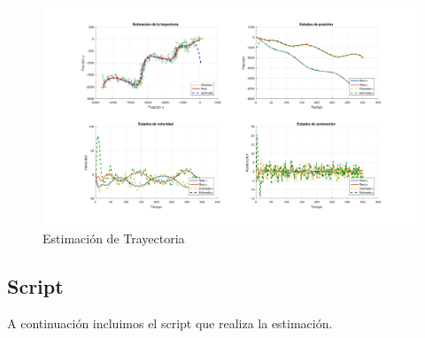 	\begin{figure}[H]
		\centering
		\includegraphics[scale=0.5,trim={6,5cm 0 0 0}]{Figuras/graf_ej5.pdf}
		\caption{Estimación de Trayectoria}
		\label{fig:ej6_cov}
	\end{figure}
	
	
	\subsection{Script}

	A continuación incluimos el script que realiza la estimación.
	
